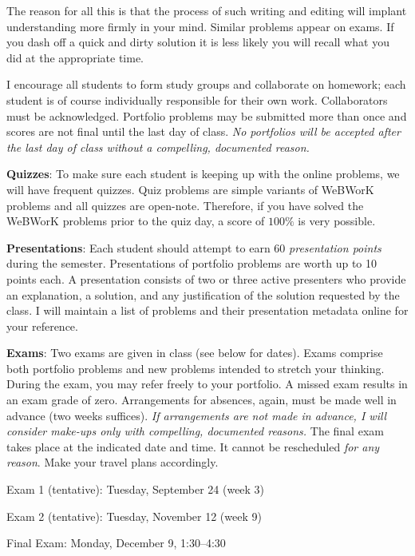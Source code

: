 \documentclass[12pt,twoside]{amsart}
\begin{document}
The reason for all this is that the process of such writing and editing will implant understanding more firmly in your mind. Similar problems appear on exams. If you dash off a quick and dirty solution it is less likely you will recall what you did at the appropriate time.

I encourage all students to form study groups and collaborate on homework; each student is of course individually responsible for their own work. Collaborators must be acknowledged. Portfolio problems may be submitted more than once and scores are not final until the last day of class. \emph{No portfolios will be accepted after the last day of class without a compelling, documented reason.}

\textbf{Quizzes}: To make sure each student is keeping up with the online problems, we will have frequent quizzes. Quiz problems are simple variants of WeBWorK problems and all quizzes are open-note. Therefore, if you have solved the WeBWorK problems prior to the quiz day, a score of $100\%$ is very possible.

\textbf{Presentations}: Each student should attempt to earn 60 \emph{presentation points} during the semester. Presentations of portfolio problems are worth up to 10 points each. A presentation consists of two or three active presenters who provide an explanation, a solution, and any justification of the solution requested by the class. I will maintain a list of problems and their presentation metadata online for your reference. 

\textbf{Exams}: Two exams are given in class (see below for dates). Exams comprise both portfolio problems and new problems intended to stretch your thinking. During the exam, you may refer freely to your portfolio. A missed exam results in an exam grade of zero. Arrangements for absences, again, must be made well in advance (two weeks suffices). \emph{If arrangements are not made in advance, I will consider make-ups only with compelling, documented reasons.} The final exam takes place at the indicated date and time. It cannot be rescheduled \emph{for any reason}. Make your travel plans accordingly.
\begin{compactitem}
	\item Exam 1 (tentative): Tuesday, September 24 (week 3)
    \item Exam 2 (tentative): Tuesday, November 12 (week 9)
	\item Final Exam: Monday, December 9, 1:30--4:30
\end{compactitem}
\end{document}
